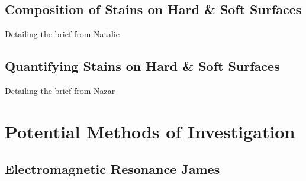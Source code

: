 \documentclass[a4paper ,12pt]{article}
\begin{document}
\subsection{Composition of Stains on Hard \& Soft Surfaces}
Detailing the brief from Natalie
\subsection{Quantifying Stains on Hard \& Soft Surfaces}
Detailing the brief from Nazar

\section{Potential Methods of Investigation}
\subsection{Electromagnetic Resonance James}
\end{document}
